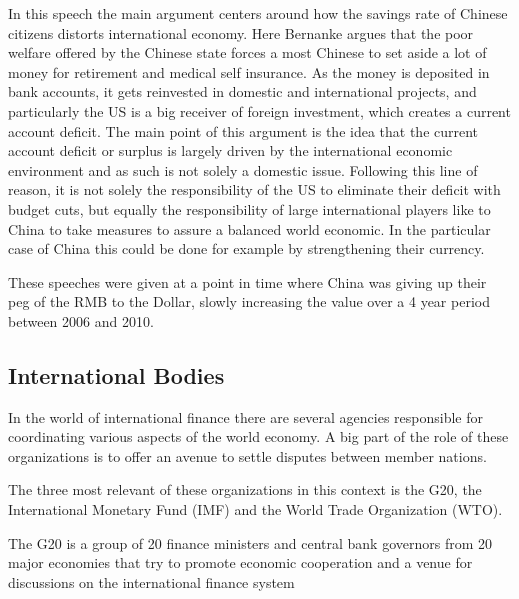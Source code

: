 In this speech the main argument centers around how the savings rate 
of Chinese citizens distorts international economy. Here Bernanke argues 
that the poor welfare offered by the Chinese state forces a most Chinese 
to set aside a lot of money for retirement and medical self insurance.  
As the money is deposited in bank accounts, it gets reinvested in 
domestic and international projects, and particularly the US is a big 
receiver of foreign investment, which creates a current account deficit.  
The main point of this argument is the idea that the current account 
deficit or surplus is largely driven by the international economic 
environment and as such is not solely a domestic issue. Following this 
line of reason, it is not solely the responsibility of the US to 
eliminate their deficit with budget cuts, but equally the responsibility 
of large international players like to China to take measures to assure 
a balanced world economic. In the particular case of China this could be 
done for example by strengthening their currency.

These speeches were given at a point in time where China was giving up 
their peg of the RMB to the Dollar, slowly increasing the value over a 4 
year period between 2006 and 2010.

\subsection{International Bodies}

In the world of international finance there are several agencies 
responsible for coordinating various aspects of the world economy. A big 
part of the role of these organizations is to offer an avenue to settle 
disputes between member nations. %

The three most relevant of these organizations in this context is the 
G20, the International Monetary Fund (IMF) and the World Trade 
Organization (WTO).

The G20 is a group of 20 finance ministers and central bank governors 
from 20 major economies that try to promote economic cooperation and a 
venue for discussions on the international finance system









